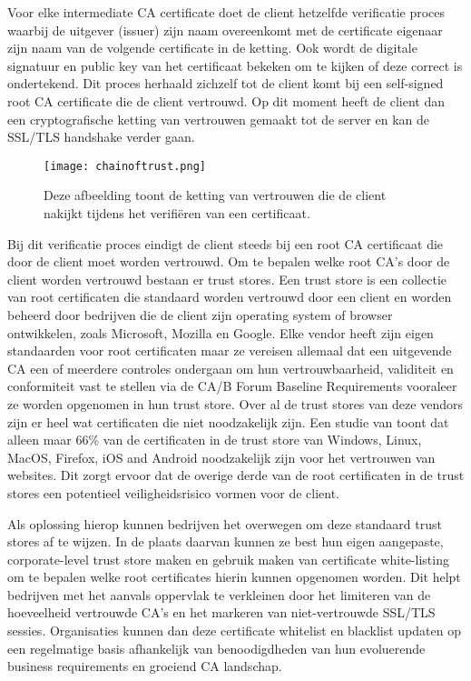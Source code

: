 Voor elke intermediate CA certificate doet de client hetzelfde verificatie proces waarbij de uitgever (issuer) zijn naam overeenkomt met de certificate eigenaar zijn naam van de volgende certificate in de ketting. Ook wordt de digitale signatuur en public key van het certificaat bekeken om te kijken of deze correct is ondertekend.
Dit proces herhaald zichzelf tot de client komt bij een self-signed root CA certificate die de client vertrouwd.
Op dit moment heeft de client dan een cryptografische ketting van vertrouwen gemaakt tot de server en kan de SSL/TLS handshake verder gaan. \break
\begin{figure}
  \centering
  \texttt{[image: chainoftrust.png]}
  \caption[Chain of trust]{\label{fig:chainoftrust}Deze afbeelding toont de ketting van vertrouwen die de client nakijkt tijdens het verifiëren van een certificaat.}
\end{figure}

Bij dit verificatie proces eindigt de client steeds bij een root CA certificaat die door de client moet worden vertrouwd. Om te bepalen welke root CA's door de client worden vertrouwd bestaan er trust stores.
Een trust store is een collectie van root certificaten die standaard worden vertrouwd door een client en worden beheerd door bedrijven die de client zijn operating system of browser ontwikkelen, zoals Microsoft, Mozilla en Google.
Elke vendor heeft zijn eigen standaarden voor root certificaten maar ze vereisen allemaal dat een uitgevende CA een of meerdere controles ondergaan om hun vertrouwbaarheid, validiteit en conformiteit vast te stellen via de CA/B Forum Baseline Requirements vooraleer ze worden opgenomen in hun trust store. \autocite{Venafi}
Over al de trust stores van deze vendors zijn er heel wat certificaten die niet noodzakelijk zijn. Een studie van \textcite{PerlHenning} toont dat alleen maar 66\% van de certificaten in de trust store van Windows, Linux, MacOS, Firefox, iOS and Android noodzakelijk zijn voor het vertrouwen van websites.
Dit zorgt ervoor dat de overige derde van de root certificaten in de trust stores een potentieel veiligheidsrisico vormen voor de client. \break

Als oplossing hierop kunnen bedrijven het overwegen om deze standaard trust stores af te wijzen. In de plaats daarvan kunnen ze best hun eigen aangepaste, corporate-level trust store maken en gebruik maken van certificate white-listing om te bepalen welke root certificates hierin kunnen opgenomen worden.
Dit helpt bedrijven met het aanvals oppervlak te verkleinen door het limiteren van de hoeveelheid vertrouwde CA's en het markeren van niet-vertrouwde SSL/TLS sessies.
Organisaties kunnen dan deze certificate whitelist en blacklist updaten op een regelmatige basis afhankelijk van benoodigdheden van hun evoluerende business requirements en groeiend CA landschap. \autocite{Venafi} 

